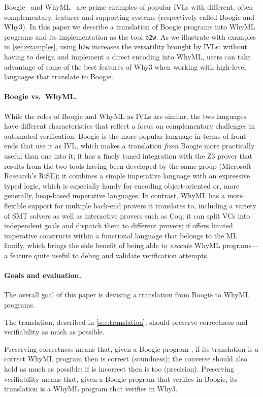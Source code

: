 \documentclass[a4paper,final]{llncs}
\makeatletter
\newif\iflong
\newcommand{\btw}{\texttt{b2w}\xspace}
\newcommand{\Boogie}{Boogie\xspace}
\newcommand{\WhyML}{WhyML\xspace}
\newcommand{\Why}{Why3\xspace}
\newcommand{\tightParagraph}[1]{\paragraph{#1}}
\newcommand\tightParagraph{\@startsection{paragraph}{4}{\z@}{-5\p@ \@plus -4\p@ \@minus -4\p@}{-0.5em \@plus -0.22em \@minus -0.1em}{\normalfont\normalsize\itshape}}
\makeatother
\begin{document}
\Boogie~\cite{boogie-baseref} and \WhyML~\cite{FilliatreP13} are prime examples of popular IVLs with different, often complementary, features and supporting systems (respectively called \Boogie and \Why).
In this paper we describe a translation of \Boogie programs into \WhyML programs and its implementation as the tool \btw.
As we illustrate with examples in \autoref{sec:examples}, using \btw increases the versatility brought by IVLs: without having to design and implement a direct encoding into \WhyML\iflong or even being familiar with its peculiarities\fi, users can take advantage of some of the best features of \Why when working with high-level languages that translate to \Boogie. 




\tightParagraph{\Boogie vs.\ \WhyML.}
While the roles of \Boogie and \WhyML as IVLs are similar, the two languages have different characteristics that reflect a focus on complementary challenges in automated verification.
\Boogie is the more popular language in terms of front-ends that use it as IVL, which makes a translation \emph{from} \Boogie more practically useful than one into it; it has a finely tuned integration with the Z3 prover that results from the two tools having been developed by the same group (Microsoft Research's RiSE); it combines a simple imperative language with an expressive typed logic, which is especially handy for encoding object-oriented or, more generally, heap-based imperative languages.
In contrast, \WhyML has a more flexible support for multiple back-end provers it translates to, including a variety of SMT solvers as well as interactive provers such as Coq; it can split VCs into independent goals and dispatch them to different provers; if offers limited imperative constructs within a functional language that belongs to the ML family, which brings the side benefit of being able to \emph{execute} \WhyML programs---a feature quite useful to debug and validate verification attempts.


\tightParagraph{Goals and evaluation.}
The overall goal of this paper is devising a translation  from \Boogie to \WhyML programs.
\iflong
The translation, described in \autoref{sec:translation}, should preserve correctness, verifiability, and readability as much as possible.
\else
The translation, described in \autoref{sec:translation}, should preserve correctness and verifiability as much as possible.
\fi
Preserving correctness means that, given a \Boogie program , if its translation  is a correct \WhyML program then  is correct (soundness); the converse should also hold as much as possible: if  is incorrect then  is too (precision).
Preserving verifiability means that, given a \Boogie program  that verifies in \Boogie, its translation  is a \WhyML program that verifies in \Why.
\iflong
Preserving readability means that the translation should not introduce unnecessary changes in the structure of programs.
\fi
\end{document}

